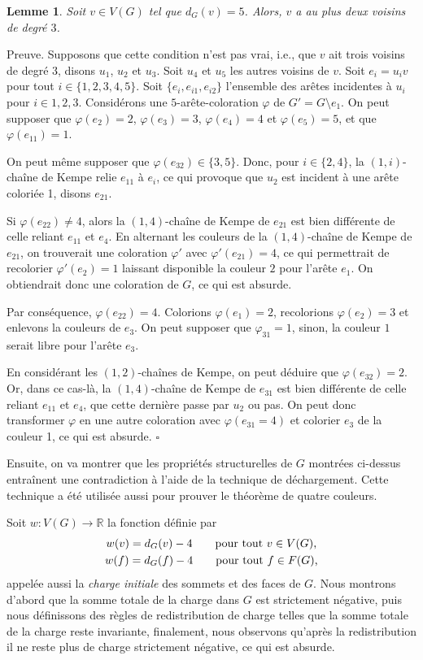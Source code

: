 \documentclass[10pt,a4paper]{article}
\newtheorem{lemme}{Lemme}
\newcommand{\ep}{{\hfill $\square$}}
\begin{document}
\begin{lemme}
Soit $v \in V(G)$ tel que $d_G(v) = 5$. Alors, $v$ a au plus deux voisins de degré $3$.
\label{le:5333}
\end{lemme}


Preuve.
Supposons que cette condition n'est pas vrai, i.e., que $v$ ait trois voisins de degré 3, disons $u_1$, $u_2$ et $u_3$. Soit $u_4$ et $u_5$ les autres voisins de $v$. Soit $e_i = u_iv$ pour tout $i \in \{1,2,3,4,5\}$. Soit $\{e_i, e_{i1}, e_{i2}\}$ l'ensemble des arêtes incidentes à $u_i$ pour $i \in {1,2,3}$. Considérons une $5$-arête-coloration $\varphi$ de $G' = G \setminus e_1$. On peut supposer que $\varphi(e_2)=2$, $\varphi(e_3)=3$, $\varphi(e_4)=4$ et $\varphi(e_5)=5$, et que $\varphi(e_{11}) = 1$. 

On peut même supposer que $\varphi(e_{32}) \in \{3,5\}$.
Donc, pour $i \in \{2,4\}$, la $(1,i)$-chaîne de Kempe relie $e_{11}$ à $e_i$, ce qui provoque que $u_2$ est incident à une arête coloriée 1, disons $e_{21}$. 

Si $\varphi(e_{22}) \ne 4$, alors la $(1,4)$-chaîne de Kempe de $e_{21}$ est bien différente de celle reliant $e_{11}$ et $e_4$. En alternant les couleurs de la $(1,4)$-chaîne de Kempe de $e_{21}$, on trouverait une coloration $\varphi'$ avec $\varphi'(e_{21})=4$, ce qui permettrait de recolorier $\varphi'(e_2) = 1$ laissant disponible la couleur $2$ pour l'arête $e_1$. On obtiendrait donc une coloration de $G$, ce qui est absurde. 

Par conséquence, $\varphi(e_{22}) = 4$. Colorions $\varphi(e_1)=2$, recolorions $\varphi(e_2)=3$ et enlevons la couleurs de $e_3$.
On peut supposer que $\varphi_{31}=1$, sinon, la couleur $1$ serait libre pour l'arête $e_3$.

En considérant les $(1,2)$-chaînes de Kempe, on peut déduire que $\varphi(e_{32})=2$. Or, dans ce cas-là, la $(1,4)$-chaîne de Kempe de $e_{31}$ est bien différente de celle reliant $e_{11}$ et $e_4$, que cette dernière passe par $u_2$ ou pas. On peut donc transformer $\varphi$ en une autre coloration avec $\varphi(e_{31}=4)$ et colorier $e_3$ de la couleur 1, ce qui est absurde.
\ep


\bigskip
Ensuite, on va montrer que les propriétés structurelles de $G$ montrées ci-dessus entraînent une contradiction à l'aide de la technique de déchargement. Cette technique a été utilisée aussi pour prouver le théorème de quatre couleurs. 

Soit $w: V(G) \to \mathbb{R}$  la fonction définie par
 $$
 \gathered
 w(v) = d_G(v) - 4 \qquad \textrm{pour tout $v\in V(G)$,} \\
 w(f) = d_G(f) - 4 \qquad \textrm{pour tout $f\in F(G)$,} 
\endgathered 
$$
appelée aussi la \emph{charge initiale} des sommets et des faces de $G$. Nous montrons d'abord que la somme totale de la charge dans $G$ est strictement négative, puis nous définissons des règles de redistribution de charge telles que la somme totale de la charge reste invariante, finalement, nous observons qu'après la redistribution il ne reste plus de charge strictement négative, ce qui est absurde.
\end{document}
